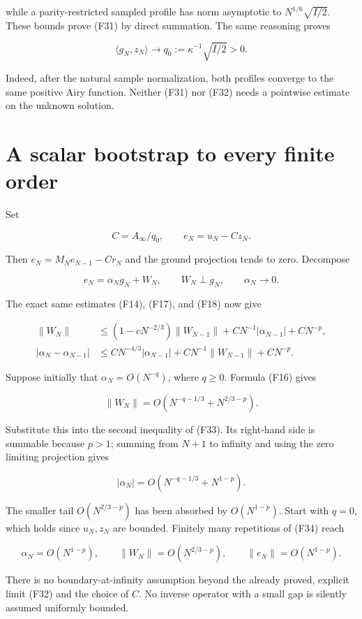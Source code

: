 \documentclass[11pt,letterpaper]{article}
\numberwithin{equation}{section}
\theoremstyle{remark}
\begin{document}
while a parity-restricted sampled profile has norm asymptotic to \(N^{1/6}\sqrt{I/2}\). These bounds prove (F31) by direct summation. The same reasoning proves

\[
\langle g_N,z_N\rangle\longrightarrow
q_0:=\kappa^{-1}\sqrt{I/2}>0.
\tag{F32}
\]

Indeed, after the natural sample normalization, both profiles converge to the same positive Airy function. Neither (F31) nor (F32) needs a pointwise estimate on the unknown solution.

\section{A scalar bootstrap to every finite order}\label{air:rb:a-scalar-bootstrap-to-every-finite-order}

Set

\[
C=A_\infty/q_0,\qquad e_N=u_N-Cz_N.
\]

Then \(e_N=M_Ne_{N-1}-Cr_N\) and the ground projection tends to zero. Decompose

\[
e_N=\alpha_Ng_N+W_N,\qquad W_N\perp g_N,
\qquad \alpha_N\longrightarrow0.
\]

The exact same estimates (F14), (F17), and (F18) now give

\[
\begin{aligned}
\|W_N\|&\le(1-cN^{-2/3})\|W_{N-1}\|
+CN^{-1}|\alpha_{N-1}|+CN^{-p},\\
|\alpha_N-\alpha_{N-1}|&\le
CN^{-4/3}|\alpha_{N-1}|+CN^{-1}\|W_{N-1}\|+CN^{-p}.
\end{aligned}
\tag{F33}
\]

Suppose initially that \(\alpha _N=O(N^{-q})\), where \(q\ge 0\). Formula (F16) gives

\[
\|W_N\|=O(N^{-q-1/3}+N^{2/3-p}).
\]

Substitute this into the second inequality of (F33). Its right-hand side is summable because \(p>1\); summing from \(N+1\) to infinity and using the zero limiting projection gives

\[
|\alpha_N|=O(N^{-q-1/3}+N^{1-p}).
\tag{F34}
\]

The smaller tail \(O(N^{2/3-p})\) has been absorbed by \(O(N^{1-p})\). Start with \(q=0\), which holds since \(u_N,z_N\) are bounded. Finitely many repetitions of (F34) reach

\[
\alpha_N=O(N^{1-p}),\qquad
\|W_N\|=O(N^{2/3-p}),\qquad
\|e_N\|=O(N^{1-p}).
\tag{F35}
\]

There is no boundary-at-infinity assumption beyond the already proved, explicit limit (F32) and the choice of \(C\). No inverse operator with a small gap is silently assumed uniformly bounded.
\end{document}
